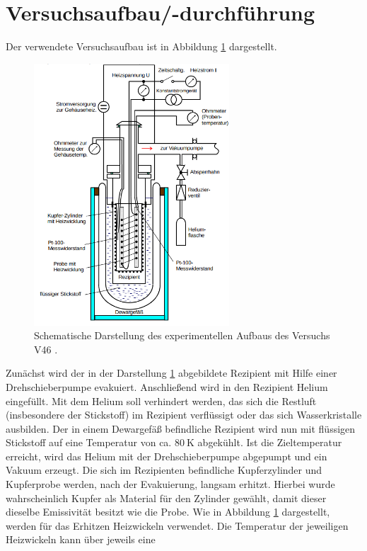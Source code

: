 \section{Versuchsaufbau/-durchführung}
Der verwendete Versuchsaufbau ist in Abbildung \ref{fig: aufbau} dargestellt.
\begin{figure}
  \centering
  \includegraphics[width = 0.65\textwidth]{./content/images/aufbau.png}
  \caption{Schematische Darstellung des experimentellen Aufbaus des Versuchs V46  \cite{anleitungV47}.}
  \label{fig: aufbau}
\end{figure}
Zunächst wird der in der Darstellung \ref{fig: aufbau} abgebildete Rezipient
mit Hilfe einer Drehschieberpumpe evakuiert. Anschließend wird in den Rezipient
Helium eingefüllt. Mit dem Helium soll verhindert werden, das sich die Restluft
(insbesondere der Stickstoff) im Rezipient verflüssigt oder das sich Wasserkristalle
ausbilden. Der in einem Dewargefäß befindliche Rezipient wird nun mit flüssigen
Stickstoff auf eine Temperatur von ca. $\SI{80}{\kelvin}$ abgekühlt. Ist die
Zieltemperatur erreicht, wird das Helium mit der Drehschieberpumpe abgepumpt und
ein Vakuum erzeugt. Die sich im Rezipienten befindliche Kupferzylinder und
Kupferprobe werden, nach der Evakuierung, langsam erhitzt. Hierbei wurde wahrscheinlich Kupfer als Material
für den Zylinder gewählt, damit dieser dieselbe Emissivität besitzt
wie die Probe. Wie in Abbildung \ref{fig: aufbau} dargestellt, werden für das Erhitzen
Heizwickeln verwendet. Die Temperatur der jeweiligen Heizwickeln kann über jeweils eine
